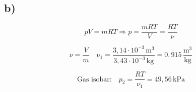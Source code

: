

\subsection*{b)}

\[
pV = mRT \Rightarrow p = \frac{mRT}{V} = \frac{RT}{\nu}
\]

\[
\nu = \frac{V}{m} \quad \nu_1 = \frac{3,14 \cdot 10^{-3} \, \text{m}^3}{3,43 \cdot 10^{-3} \, \text{kg}} = 0,915 \, \frac{\text{m}^3}{\text{kg}}
\]

\[
\text{Gas isobar:} \quad p_2 = \frac{RT}{\nu_1} = 49,56 \, \text{kPa}
\]